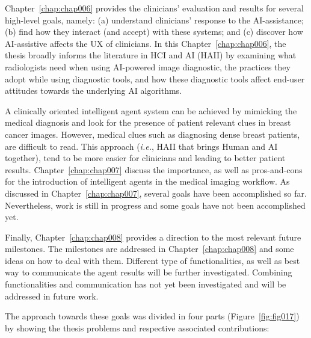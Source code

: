 Chapter~\ref{chap:chap006} provides the clinicians' evaluation and results for several high-level goals, namely:
(a) understand clinicians' response to the \ac{AI}-assistance;
(b) find how they interact (and accept) with these systems; and
(c) discover how \ac{AI}-assistive affects the \ac{UX} of clinicians.
In this Chapter~\ref{chap:chap006}, the thesis broadly informs the literature in \ac{HCI} and \ac{AI} (\ac{HAII}) by examining what radiologists need when using \ac{AI}-powered image diagnostic, the practices they adopt while using diagnostic tools, and how these diagnostic tools affect end-user attitudes towards the underlying \ac{AI} algorithms.

A clinically oriented intelligent agent system can be achieved by mimicking the medical diagnosis and look for the presence of patient relevant clues in breast cancer images.
However, medical clues such as diagnosing dense breast patients, are difficult to read.
This approach ({\it i.e.}, \ac{HAII} that brings Human and \ac{AI} together), tend to be more easier for clinicians and leading to better patient results.
Chapter~\ref{chap:chap007} discuss the importance, as well as pros-and-cons for the introduction of intelligent agents in the medical imaging workflow.
As discussed in Chapter~\ref{chap:chap007}, several goals have been accomplished so far.
Nevertheless, work is still in progress and some goals have not been accomplished yet.

Finally, Chapter~\ref{chap:chap008} provides a direction to the most relevant future milestones.
The milestones are addressed in Chapter~\ref{chap:chap008} and some ideas on how to deal with them.
Different type of functionalities, as well as best way to communicate the agent results will be further investigated.
Combining functionalities and communication has not yet been investigated and will be addressed in future work.

\noindent
The approach towards these goals was divided in four parts (Figure~\ref{fig:fig017}) by showing the thesis problems and respective associated contributions:

\hfill

